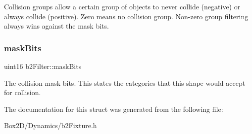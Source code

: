 Collision groups allow a certain group of objects to never collide (negative) or always collide (positive). Zero means no collision group. Non-\/zero group filtering always wins against the mask bits. \mbox{\label{structb2_filter_a533cccf85e3ba3d9e3700d73b819f6e2}} 
\subsubsection{\texorpdfstring{mask\+Bits}{maskBits}}
{\footnotesize\ttfamily uint16 b2\+Filter\+::mask\+Bits}

The collision mask bits. This states the categories that this shape would accept for collision. 

The documentation for this struct was generated from the following file\+:\begin{DoxyCompactItemize}
\item 
Box2\+D/\+Dynamics/b2\+Fixture.\+h\end{DoxyCompactItemize}
